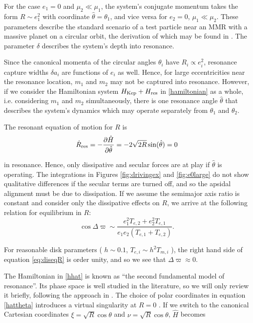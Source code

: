 \documentclass{mnras}
\renewcommand{\d}{\partial}
\begin{document}
For the case \(e_1=0\) and \(\mu_2\ll\mu_1\), the system's conjugate
momentum takes the form \(R\sim e_1^2\) with coordinate \(\hat \theta =
\theta_1\), and vice versa for \(e_2=0\), \(\mu_1\ll\mu_2\).  These parameters
describe the standard scenario of a test particle near an MMR with a
massive planet on a circular orbit, the derivation of which may be
found in \cite{murray_solar_2000}. The parameter \(\delta\) describes the
system's depth into resonance.

Since the canonical momenta of the circular angles \(\theta_i\) have
\(R_i\propto e_i^2\), resonance capture widths \(\delta a_i\) are
functions of \(e_i\) as well. Hence, for large eccentricities near the
resonance location, \(m_1\) and \(m_2\) may not be captured into
resonance. However, if we consider the Hamiltonian system \(H_{\rm
Kep} + H_{\rm res}\) in \eqref{hamiltonian} as a whole, i.e. considering
\(m_1\) and \(m_2\) simultaneously, there is one resonance angle
\(\hat\theta\) that describes the system's dynamics which may operate
separately from \(\theta_1\) and \(\theta_2\).


The resonant equation of motion for \(R\) is
\begin{equation}
  \dot R_{\rm res} = -\frac{\d \hat H}{\d \hat\theta} = -2\sqrt{2R}\sin(\hat\theta) = 0
\end{equation}

in resonance.  Hence, only dissipative and secular forces are at play
if \(\hat\theta\) is operating.  The integrations in Figures
\ref{fig:drivingex} and \ref{fig:e0large} do not show qualitative
differences if the secular terms are turned off, and so the apsidal
alignment must be due to dissipation. If we assume the semimajor axis
ratio is constant and consider only the dissipative effects on \(R\), we
arrive at the following relation for equilibrium in \(R\):
\begin{equation}
  \label{eq:diseqR}
  \cos\Delta\varpi \sim \frac{e_1^2 T_{e,2} + e_2^2 T_{e,1}}{e_1e_2(T_{e,1}+T_{e,2})}.
\end{equation}

For reasonable disk parameters ( \(h\sim 0.1\), \(T_{e,i}\sim h^2
T_{m,i}\) ), the right hand side of equation \eqref{eq:diseqR}
is order unity, and so we see that \(\Delta\varpi\approx 0\).


The Hamiltonian in \eqref{hhat} is known as ``the second fundamental
model of resonance''. Its phase space is well studied in the
literature, so we will only review it briefly, following the approach
in \cite{henrard_second_1983}.  The choice of polar coordinates in
equation \eqref{hattheta} introduces a virtual singularity at \(R=0\)
\cite{henrard_second_1983}.  If we switch to the canonical Cartesian
coordinates \(\xi = \sqrt{R}\cos\theta\) and \(\nu = \sqrt{R}\cos\theta\),
\(\hat H\) becomes
\end{document}
